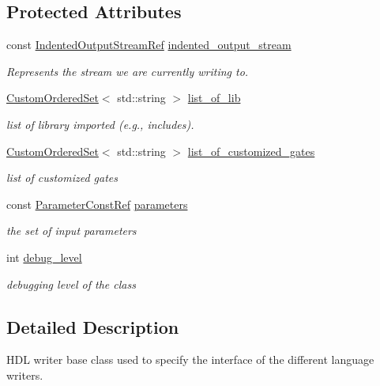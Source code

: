 \subsection*{Protected Attributes}
\begin{DoxyCompactItemize}
\item 
const \hyperlink{indented__output__stream_8hpp_ab32278e11151ef292759c88e99b77feb}{Indented\+Output\+Stream\+Ref} \hyperlink{classlanguage__writer_a19ffce0f39dd5b8c6fa606086ebf8820}{indented\+\_\+output\+\_\+stream}
\begin{DoxyCompactList}\small\item\em Represents the stream we are currently writing to. \end{DoxyCompactList}\item 
\hyperlink{classCustomOrderedSet}{Custom\+Ordered\+Set}$<$ std\+::string $>$ \hyperlink{classlanguage__writer_a47561bf42c96b801a97bb476b85c0603}{list\+\_\+of\+\_\+lib}
\begin{DoxyCompactList}\small\item\em list of library imported (e.\+g., includes). \end{DoxyCompactList}\item 
\hyperlink{classCustomOrderedSet}{Custom\+Ordered\+Set}$<$ std\+::string $>$ \hyperlink{classlanguage__writer_a4f37d553bed8fa6e09f4c0623ba3ec55}{list\+\_\+of\+\_\+customized\+\_\+gates}
\begin{DoxyCompactList}\small\item\em list of customized gates \end{DoxyCompactList}\item 
const \hyperlink{Parameter_8hpp_a37841774a6fcb479b597fdf8955eb4ea}{Parameter\+Const\+Ref} \hyperlink{classlanguage__writer_aeb717c1d12571e3808759009be752d59}{parameters}
\begin{DoxyCompactList}\small\item\em the set of input parameters \end{DoxyCompactList}\item 
int \hyperlink{classlanguage__writer_a5e8eec93e3573a1ea49968af8da2996a}{debug\+\_\+level}
\begin{DoxyCompactList}\small\item\em debugging level of the class \end{DoxyCompactList}\end{DoxyCompactItemize}


\subsection{Detailed Description}
H\+DL writer base class used to specify the interface of the different language writers. 

